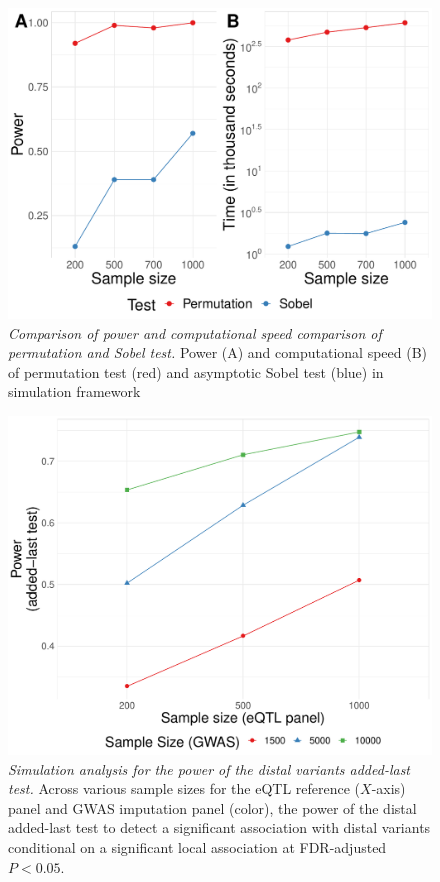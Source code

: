 \documentclass[11pt]{article}
\begin{document}
\begin{figure}[htbp]
\centering
	\includegraphics[width = .7\textwidth]{figures/ch4_fig2.pdf}
	\caption{\emph{Comparison of power 
	and computational speed comparison 
	of permutation and Sobel test.} Power (A) and computational speed (B) of permutation test (red)
	and asymptotic Sobel test (blue) in simulation framework}
	\label{fig:ch4_fig2}
\end{figure}

\begin{figure}[htbp]
\centering
	\includegraphics[width = .7\textwidth]{figures/ch4_suppfig4.pdf}
	\caption{\emph{Simulation
	analysis for the power
	of the distal variants
	added-last test.} Across
	various sample sizes
	for the eQTL reference ($X$-axis)
	panel and GWAS imputation
	panel (color), the power
	of the distal added-last
	test to detect a significant
	association with distal
	variants conditional
	on a significant local association
	at FDR-adjusted $P < 0.05$.}
	\label{fig:ch4_suppfig4}
\end{figure}
\end{document}
